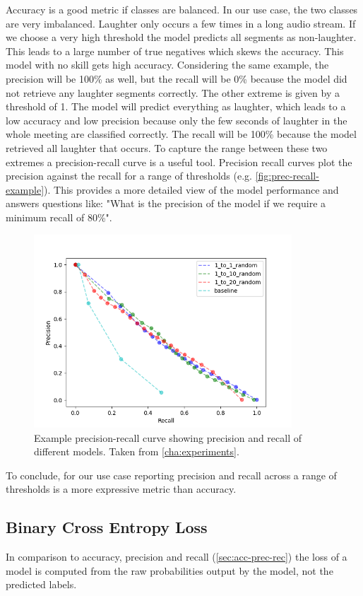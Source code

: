 \documentclass[bsc,frontabs,parskip,deptreport]{infthesis}
\begin{document}
Accuracy is a good metric if classes are balanced. In our use case, the two classes are very imbalanced. Laughter only occurs a few times in a long audio stream. If we choose a very high threshold the model predicts all segments as non-laughter. This leads to a large number of true negatives which skews the accuracy. This model with no skill gets high accuracy.
Considering the same example, the precision will be 100\% as well, but the recall will be 0\% because the model did not retrieve any laughter segments correctly. 
The other extreme is given by a threshold of 1. The model will predict everything as laughter, which leads to a low accuracy and low precision because only the few seconds of laughter in the whole meeting are classified correctly. The recall will be 100\% because the model retrieved all laughter that occurs. 
To capture the range between these two extremes a precision-recall curve is a useful tool. Precision recall curves plot the precision against the recall for a range of thresholds (e.g. \autoref{fig:prec-recall-example}). This provides a more detailed view of the model performance and answers questions like: "What is the precision of the model if we require a minimum recall of 80\%".

\begin{figure}[h!]
    \centering
    \includegraphics[width = 3.8in]{imgs/prec-recall/random/dev_compare_class_balance_dev_set.png}
    \caption{Example precision-recall curve showing precision and recall of different models. Taken from \autoref{cha:experiments}.}
    \label{fig:prec-recall-example}
\end{figure}

To conclude, for our use case reporting precision and recall across a range of thresholds is a more expressive metric than accuracy.

\subsection{Binary Cross Entropy Loss}
In comparison to accuracy, precision and recall (\autoref{sec:acc-prec-rec}) the loss of a model is computed from the raw probabilities output by the model, not the predicted labels.
\end{document}
